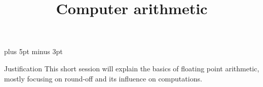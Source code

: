 \documentclass[11pt,headernav]{beamer}
\begin{document}
\parskip=10pt plus 5pt minus 3pt

\title{Computer arithmetic}
\author{\hpcteachers}
\date{\hpcsemester}

\begin{frame}
  \titlepage
\end{frame}

\begin{frame}{Justification}
  This short session will explain the basics of floating point
  arithmetic, mostly focusing on round-off and its influence
  on computations.
\end{frame}


\end{document}
